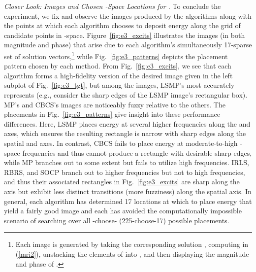 \documentclass[final]{siamltex}
\begin{document}
   {\em{Closer Look: Images and Chosen -Space Locations for
   }.}  To conclude the experiment, we fix  and observe
   the images produced by the algorithms along with the points at
   which each algorithm chooses to deposit energy along the grid of
   candidate points in -space.  Figure~\ref{fig:e3_excits}
   illustrates the images (in both magnitude and phase) that arise due
   to each algorithm's simultaneously 17-sparse set of solution
   vectors,\footnote{Each image is generated by taking the
   corresponding solution , computing  in
   (\ref{mri2}), unstacking the elements of  into ,
   and then displaying the magnitude and phase of .} while
   Fig.~\ref{fig:e3_patterns} depicts the placement pattern chosen by
   each method.  From Fig.~\ref{fig:e3_excits}, we see that each
   algorithm forms a high-fidelity version of the desired image
    given in the left subplot of Fig.~\ref{fig:e3_tgt}, but
   among the images, LSMP's most accurately represents 
   (e.g., consider the sharp edges of the LSMP image's rectangular
   box).  MP's and CBCS's images are noticeably fuzzy relative to the
   others.  The placements in Fig.~\ref{fig:e3_patterns} give insight
   into these performance differences.  Here, LSMP places energy at
   several higher frequencies along the  and  axes, which
   ensures the resulting rectangle is narrow with sharp edges along
   the spatial  and  axes.  In contrast, CBCS fails to place
   energy at moderate-to-high -space frequencies and thus
   cannot produce a rectangle with desirable sharp edges, while MP
   branches out to some extent but fails to utilize high 
   frequencies.  IRLS, RBRS, and SOCP branch out to higher 
   frequencies but not to high  frequencies, and thus their
   associated rectangles in Fig.~\ref{fig:e3_excits} are sharp along
   the  axis but exhibit less distinct transitions (more fuzziness)
   along the spatial  axis.  In general, each algorithm has
   determined 17 locations at which to place energy that yield a
   fairly good image and each has avoided the computationally
   impossible scenario of searching over all -choose-
   (225-choose-17) possible placements.
\end{document}
